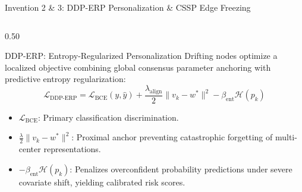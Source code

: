 \documentclass[aspectratio=169, 10pt]{beamer}
\begin{document}
\begin{frame}{Invention 2 \& 3: DDP-ERP Personalization \& CSSP Edge Freezing}
    \begin{columns}[t]
        \begin{column}{0.50\textwidth}
            \begin{alertblock}{DDP-ERP: Entropy-Regularized Personalization}
                \scriptsize
                Drifting nodes optimize a localized objective combining global consensus parameter anchoring with predictive entropy regularization:
                \begin{equation*}
                    \mathcal{L}_{\text{DDP-ERP}} = \mathcal{L}_{\text{BCE}}(y, \hat{y}) + \frac{\lambda_{\text{align}}}{2} \|v_k - w^*\|^2 - \beta_{\text{ent}} \mathcal{H}(p_k)
                \end{equation*}
                \begin{itemize}
                    \scriptsize
                    \item $\mathcal{L}_{\text{BCE}}$: Primary classification discrimination.
                    \item $\frac{\lambda}{2} \|v_k - w^*\|^2$: Proximal anchor preventing catastrophic forgetting of multi-center representations.
                    \item $-\beta_{\text{ent}} \mathcal{H}(p_k)$: Penalizes overconfident probability predictions under severe covariate shift, yielding calibrated risk scores.
                \end{itemize}
            \end{alertblock}
        \end{column}
        

\end{columns}
\end{frame}
\end{document}

